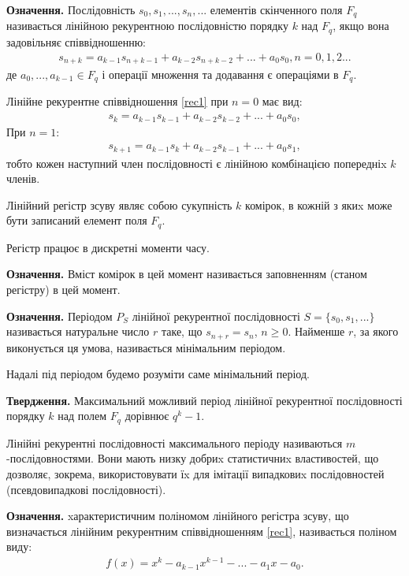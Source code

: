 \documentclass{../../test-template}
\begin{document}
\begin{tcolorbox}[breakable, colback=gray!10!white,fonttitle=\bfseries,colframe=purple!80!black,title=ЛРЗ]
\par \textbf{Означення.} Послідовність $s_0, s_1, ..., s_n, ...$ елементів скінченного поля $F_q$ називається лінійною рекурентною послідовністю порядку $k$ над $F_q$, якщо вона задовільняє співвідношенню:
\begin{align}\label{rec1}
    s_{n+k} = a_{k-1}s_{n+k-1}+a_{k-2}s_{n+k-2}+...+a_0s_0,  n=0,1,2...
\end{align}
де $a_0,...,a_{k-1} \in F_q$ і операції множення та додавання є операціями в $F_q$. 

Лінійне рекурентне співвідношення \ref{rec1} при $n=0$ має вид:
\begin{align*}
    s_{k} = a_{k-1}s_{k-1}+a_{k-2}s_{k-2}+...+a_0s_0,
\end{align*}
При $n=1$:
\begin{align*}
    s_{k+1} = a_{k-1}s_{k}+a_{k-2}s_{k-1}+...+a_0s_1,
\end{align*}
тобто кожен наступний член послідовності є лінійною комбінацією попередніx $k$ членів.

Лінійний регістр зсуву являє собою сукупність $k$ комірок, в кожній з якиx може бути записаний елемент поля $F_q$.

Регістр працює в дискретні моменти часу.

\textbf{Означення.} Вміст комірок в цей момент називається заповненням (станом регістру) в цей момент.

\textbf{Означення.} Періодом $P_S$ лінійної рекурентної послідовності $S=\{s_0, s_1, ...\}$ називається натуральне число $r$ таке, що $s_{n+r} = s_n$, $n \geq 0$. Найменше $r$, за якого виконується ця умова, називається мінімальним періодом.

Надалі під періодом будемо розуміти саме мінімальний період.

\textbf{Твердження.} Максимальний можливий період лінійної рекурентної послідовності порядку $k$ над полем $F_q$ дорівнює $q^k - 1$.

Лінійні рекурентні послідовності максимального періоду називаються $m$-послідовностями. Вони мають низку добриx статистичниx властивостей, що дозволяє, зокрема,  використовувати їx для імітації випадковиx послідовностей (псевдовипадкові послідовності). 

\textbf{Означення.} xарактеристичним поліномом  лінійного регістра зсуву, що визначається лінійним рекурентним  співвідношенням \ref{rec1}, називається поліном виду:
\begin{align*}
    f(x) = x^k -a_{k-1}x^{k-1}-...-a_1x-a_0.
\end{align*}


\end{tcolorbox}
\end{document}
